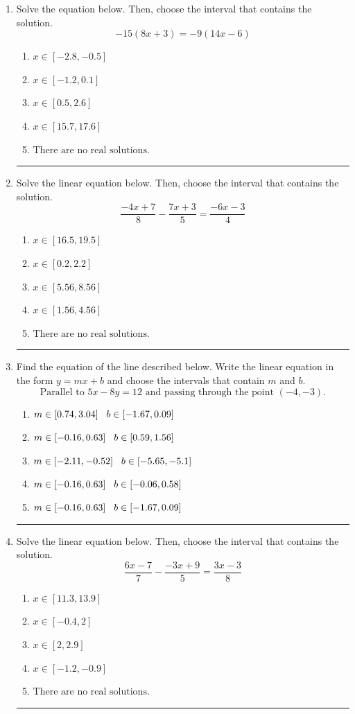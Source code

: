 \documentclass[14pt]{extbook}
\newcommand{\litem}[1]{\item#1\hspace*{-1cm}\rule{\textwidth}{0.4pt}}
\begin{document}
\begin{enumerate}
{\begin{enumerate}[label=\Alph*.]
\end{enumerate} }
\litem{
Solve the equation below. Then, choose the interval that contains the solution.\[ -15(8x + 3) = -9(14x -6) \]\begin{enumerate}[label=\Alph*.]
\item \( x \in [-2.8, -0.5] \)
\item \( x \in [-1.2, 0.1] \)
\item \( x \in [0.5, 2.6] \)
\item \( x \in [15.7, 17.6] \)
\item \( \text{There are no real solutions.} \)

\end{enumerate} }
\litem{
Solve the linear equation below. Then, choose the interval that contains the solution.\[ \frac{-4x + 7}{8} - \frac{7x + 3}{5} = \frac{-6x -3}{4} \]\begin{enumerate}[label=\Alph*.]
\item \( x \in [16.5, 19.5] \)
\item \( x \in [0.2, 2.2] \)
\item \( x \in [5.56, 8.56] \)
\item \( x \in [1.56, 4.56] \)
\item \( \text{There are no real solutions.} \)

\end{enumerate} }
\litem{
Find the equation of the line described below. Write the linear equation in the form $ y=mx+b $ and choose the intervals that contain $m$ and $b$.\[ \text{Parallel to } 5 x - 8 y = 12 \text{ and passing through the point } (-4, -3). \]\begin{enumerate}[label=\Alph*.]
\item \( m \in [0.74, 3.04] \hspace*{3mm} b \in [-1.67, 0.09] \)
\item \( m \in [-0.16, 0.63] \hspace*{3mm} b \in [0.59, 1.56] \)
\item \( m \in [-2.11, -0.52] \hspace*{3mm} b \in [-5.65, -5.1] \)
\item \( m \in [-0.16, 0.63] \hspace*{3mm} b \in [-0.06, 0.58] \)
\item \( m \in [-0.16, 0.63] \hspace*{3mm} b \in [-1.67, 0.09] \)

\end{enumerate} }
\litem{
Solve the linear equation below. Then, choose the interval that contains the solution.\[ \frac{6x -7}{7} - \frac{-3x + 9}{5} = \frac{3x -3}{8} \]\begin{enumerate}[label=\Alph*.]
\item \( x \in [11.3, 13.9] \)
\item \( x \in [-0.4, 2] \)
\item \( x \in [2, 2.9] \)
\item \( x \in [-1.2, -0.9] \)
\item \( \text{There are no real solutions.} \)


\end{enumerate}}
\end{enumerate}
\end{document}
